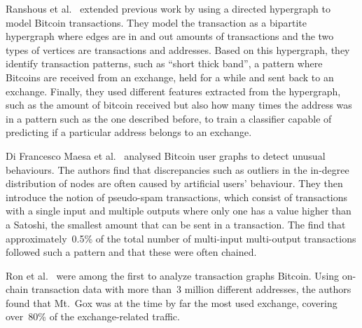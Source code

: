 Ranshous et al.~\cite{10.1007/978-3-319-70278-0_16} extended previous work by using a directed hypergraph to model Bitcoin transactions. They model the transaction as a bipartite hypergraph where edges are in and out amounts of transactions and the two types of vertices are transactions and addresses. Based on this hypergraph, they identify transaction patterns, such as ``short thick band'', a pattern where Bitcoins are received from an exchange, held for a while and sent back to an exchange. Finally, they used different features extracted from the hypergraph, such as the amount of bitcoin received but also how many times the address was in a pattern such as the one described before, to train a classifier capable of predicting if a particular address belongs to an exchange.

Di Francesco Maesa et al.~\cite{10.1007/978-3-319-50901-3_59} analysed Bitcoin user graphs to detect unusual behaviours. The authors find that discrepancies such as outliers in the in-degree distribution of nodes are often caused by artificial users' behaviour. They then introduce the notion of pseudo-spam transactions, which consist of transactions with a single input and multiple outputs where only one has a value higher than a Satoshi, the smallest amount that can be sent in a transaction. The find that approximately~0.5\% of the total number of multi-input multi-output transactions followed such a pattern and that these were often chained.


Ron et al.~\cite{10.1007/978-3-642-39884-1_2} were among the first to analyze transaction graphs Bitcoin. Using on-chain transaction data with more than~3 million different addresses, the authors found that Mt.~Gox was at the time by far the most used exchange, covering over~80\% of the exchange-related traffic.



